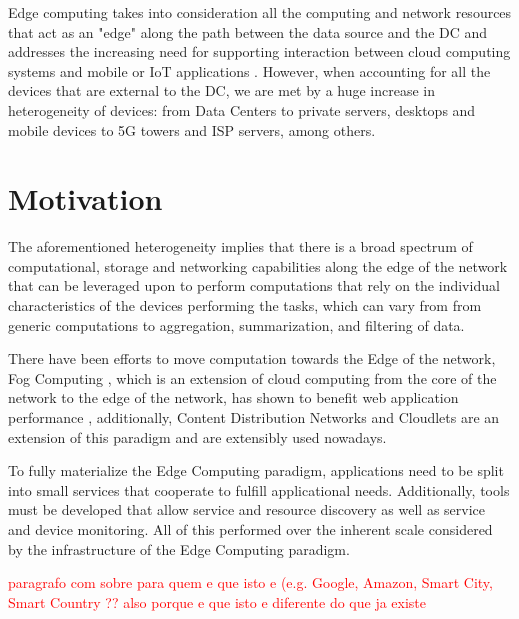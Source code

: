 Edge computing takes into consideration all the computing and network resources that act as an "edge" along the path between the data source and the DC and addresses the increasing need for supporting interaction between cloud computing systems and mobile or IoT applications \cite{iot_journal_shi_weisong_and_cao}. However, when accounting for all the devices that are external to the DC, we are met by a huge increase in heterogeneity of devices: from Data Centers to private servers, desktops and mobile devices to 5G towers and ISP servers, among others. 

\section{Motivation}

The aforementioned heterogeneity implies that there is a broad spectrum of
computational, storage and networking capabilities along the edge of the network that can be leveraged upon to perform computations that rely on the individual characteristics of the devices performing the tasks, which can vary from from generic computations to aggregation, summarization, and filtering of data. \cite{DBLP:journals/corr/abs-1805-06989}


There have been efforts to move computation towards the Edge of the network, Fog Computing \cite{yi2015fog}, which is an extension of cloud computing from the core of the network to the edge of the network, has shown to benefit web application performance \cite{Improving_Web_Sites_Performance_Using_Edge_Servers_in_Fog_Computing_Architecture}, additionally, Content Distribution Networks \cite{} and Cloudlets \cite{} 
are an extension of this paradigm and are extensibly used nowadays.

To fully materialize the Edge Computing paradigm, applications need to be split into small services that cooperate to fulfill applicational needs. 
Additionally, tools must be developed that allow service and resource discovery as well as service and device monitoring. All of this performed over the inherent scale considered by the infrastructure of the Edge Computing paradigm.

\textcolor{red}{paragrafo com sobre para quem e que isto e (e.g. Google, Amazon, Smart City, Smart Country ?? also porque e que isto e diferente do que ja existe}

